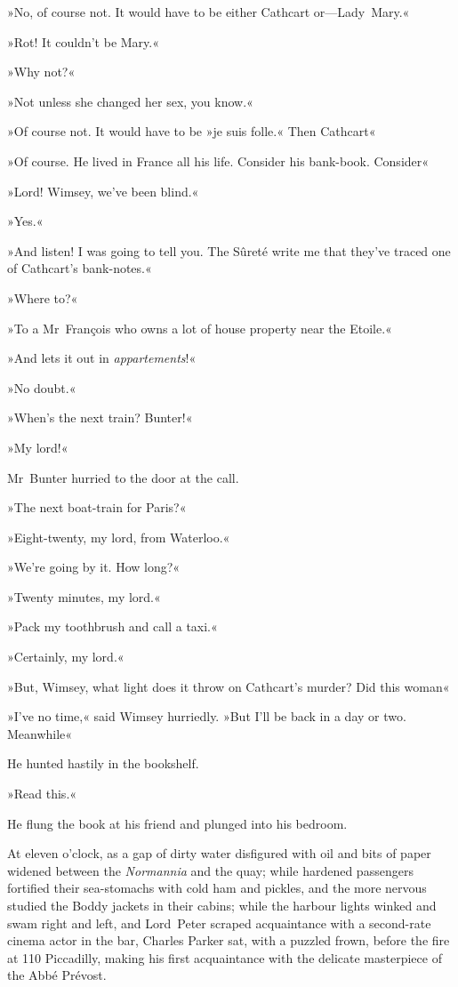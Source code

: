 »No, of course not. It would have to be either Cathcart or—Lady~Mary.«

»Rot! It couldn't be Mary.«

»Why not?«

»Not unless she changed her sex, you know.«

»Of course not. It would have to be »je suis folle.« Then Cathcart\longdash«

»Of course. He lived in France all his life. Consider his bank-book. Consider\longdash«

»Lord! Wimsey, we've been blind.«

»Yes.«

»And listen! I was going to tell you. The Sûreté write me that they've traced one of Cathcart's bank-notes.«

»Where to?«

»To a Mr~François who owns a lot of house property near the Etoile.«

»And lets it out in \textit{appartements}!«

»No doubt.«

»When's the next train? Bunter!«

»My lord!«

Mr~Bunter hurried to the door at the call.

»The next boat-train for Paris?«

»Eight-twenty, my lord, from Waterloo.«

»We're going by it. How long?«

»Twenty minutes, my lord.«

»Pack my toothbrush and call a taxi.«

»Certainly, my lord.«

»But, Wimsey, what light does it throw on Cathcart's murder? Did this woman\longdash«

»I've no time,« said Wimsey hurriedly. »But I'll be back in a day or two. Meanwhile\longdash«

He hunted hastily in the bookshelf.

»Read this.«

He flung the book at his friend and plunged into his bedroom.

At eleven o'clock, as a gap of dirty water disfigured with oil and bits of paper widened between the \textit{Normannia} and the quay; while hardened passengers fortified their sea-stomachs with cold ham and pickles, and the more nervous studied the Boddy jackets in their cabins; while the harbour lights winked and swam right and left, and Lord~Peter scraped acquaintance with a second-rate cinema actor in the bar, Charles Parker sat, with a puzzled frown, before the fire at 110 Piccadilly, making his first acquaintance with the delicate masterpiece of the Abbé Prévost.

